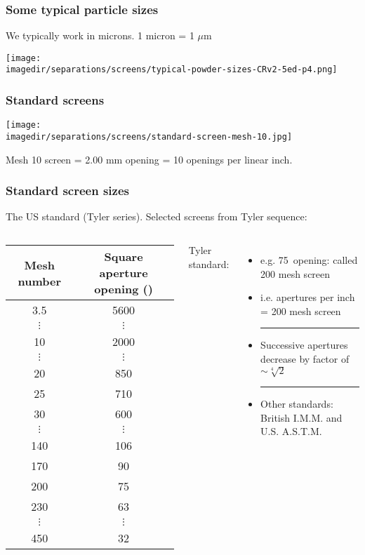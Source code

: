 \begin{frame}\frametitle{Some typical particle sizes}
	We typically work in {\color{purple}microns}. 1 micron = 1 $\mu\text{m}$
	\begin{center}
		\texttt{[image: \\imagedir/separations/screens/typical-powder-sizes-CRv2-5ed-p4.png]}
	\end{center}
\end{frame}

\begin{frame}\frametitle{Standard screens}
	\begin{center}
		\texttt{[image: \\imagedir/separations/screens/standard-screen-mesh-10.jpg]}
	\end{center}
	Mesh 10 screen = 2.00 mm opening = 10 openings per linear inch.
\end{frame}

\begin{frame}\frametitle{Standard screen sizes}
	{\small The US standard (Tyler series). Selected screens from Tyler sequence:}
	\vspace{4pt}
	\begin{columns}[c]
			\begin{tabular}{c|c}
				Mesh number & Square aperture opening (\micron) \\ \hline
				3.5		&	5600	\\
				$\vdots$& 	$\vdots$\\
				10		&	2000	\\
				$\vdots$& 	$\vdots$\\
				20		&	850		\\
				25		& 	710		\\
				30		& 	600		\\
				$\vdots$& 	$\vdots$\\
				140 	& 	106		\\
				170		& 	90		\\
				200		&	75		\\
				230 	&	63		\\
				$\vdots$& 	$\vdots$\\
				450 	& 	32 \\ \hline
			\end{tabular}
			\small
			Tyler standard:
			\begin{itemize}
				\item	e.g. 75\micron ~opening: called 200 mesh screen
				\item	i.e. apertures per inch = 200 mesh screen
				\vspace{12pt}
				\hrule
				\vspace{12pt}
				\item	Successive apertures decrease by factor of $\sim \sqrt[4]{2}$
				\vspace{12pt}
				\hrule
				\vspace{12pt}
				\item	Other standards: British I.M.M. and \\ U.S. A.S.T.M.
			\end{itemize}
	\end{columns}
\end{frame}

